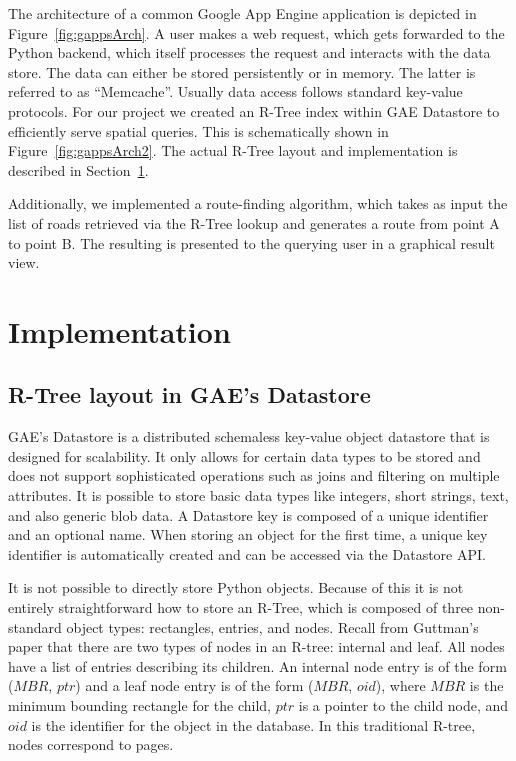 \documentclass{scrartcl}
\begin{document}
The architecture of a common Google App Engine application is depicted in Figure~\ref{fig:gappsArch}. A user makes a web request, which gets forwarded to the Python backend, which itself processes the request and interacts with the data store. The data can either be stored persistently or in memory. The latter is referred to as ``Memcache''. Usually data access follows standard key-value protocols. For our project we created an R-Tree index within GAE Datastore to efficiently serve spatial queries. This is schematically shown in Figure~\ref{fig:gappsArch2}. The actual R-Tree layout and implementation is described in Section~\ref{sec:implementation}.

Additionally, we implemented a route-finding algorithm, which takes as input the list of roads retrieved via the R-Tree lookup and generates a route from point A to point B. The resulting is presented to the querying user in a graphical result view.


\section{Implementation}
\label{sec:implementation}
\subsection{R-Tree layout in GAE's Datastore}
GAE's Datastore is a distributed schemaless key-value object datastore that is designed for scalability. It only allows for certain data types to be stored and does not support sophisticated operations such as joins and filtering on multiple attributes. It is possible to store basic data types like integers, short strings, text, and also generic blob data. A Datastore key is composed of a unique identifier and an optional name. When storing an object for the first time, a unique key identifier is automatically created and can be accessed via the Datastore API. 

It is not possible to directly store Python objects. Because of this it is not entirely straightforward how to store an R-Tree, which is composed of three non-standard object types: rectangles, entries, and nodes. Recall from Guttman's paper\cite{DBLP:conf/sigmod/Guttman84} that there are two types of nodes in an R-tree: internal and leaf. All nodes have a list of entries describing its children. An internal node entry is of the form ($MBR$, $ptr$) and a leaf node entry is of the form ($MBR$, $oid$), where $MBR$ is the minimum bounding rectangle for the child, $ptr$ is a pointer to the child node, and $oid$ is the identifier for the object in the database. In this traditional R-tree, nodes correspond to pages.
\end{document}
